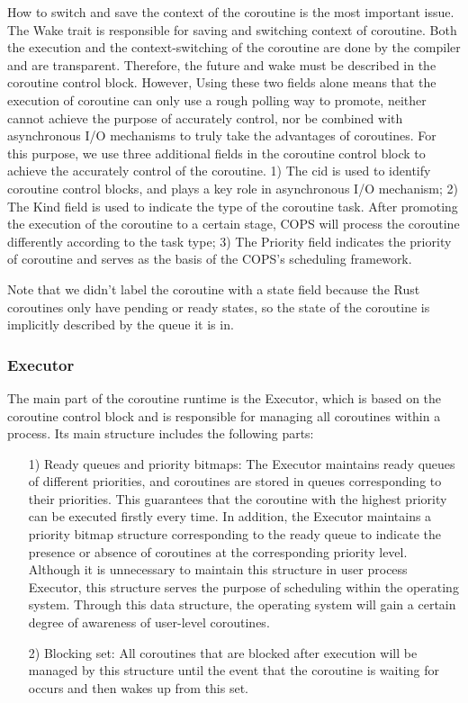 \documentclass[sigconf,review,anonymous]{acmart}
\begin{document}
How to switch and save the context of the coroutine is the most important issue. The Wake trait is responsible for saving and switching context of coroutine. Both the execution and the context-switching of the coroutine are done by the compiler and are transparent. Therefore, the future and wake must be described in the coroutine control block. However, Using these two fields alone means that the execution of coroutine can only use a rough polling way to promote, neither cannot achieve the purpose of accurately control, nor be combined with asynchronous I/O mechanisms to truly take the advantages of coroutines. For this purpose, we use three additional fields in the coroutine control block to achieve the accurately control of the coroutine. 1) The cid is used to identify coroutine control blocks, and plays a key role in asynchronous I/O mechanism; 2) The Kind field is used to indicate the type of the coroutine task. After promoting the execution of the coroutine to a certain stage, COPS will process the coroutine differently according to the task type; 3) The Priority field indicates the priority of coroutine and serves as the basis of the COPS's scheduling framework.

Note that we didn't label the coroutine with a state field because the Rust coroutines only have pending or ready states, so the state of the coroutine is implicitly described by the queue it is in.


\subsubsection{Executor}
\label{subsubsection: executor}

The main part of the coroutine runtime is the Executor, which is based on the coroutine control block and is responsible for managing all coroutines within a process. Its main structure includes the following parts:

\begin{itemize}[leftmargin=*]
    \item[1)] Ready queues and priority bitmaps: The Executor maintains ready queues of different priorities, and coroutines are stored in queues corresponding to their priorities. This guarantees that the coroutine with the highest priority can be executed firstly every time. In addition, the Executor maintains a priority bitmap structure corresponding to the ready queue to indicate the presence or absence of coroutines at the corresponding priority level. Although it is unnecessary to maintain this structure in user process Executor, this structure serves the purpose of scheduling within the operating system. Through this data structure, the operating system will gain a certain degree of awareness of user-level coroutines.
    \item[2)] Blocking set: All coroutines that are blocked after execution will be managed by this structure until the event that the coroutine is waiting for occurs and then wakes up from this set.
\end{itemize}
\end{document}
